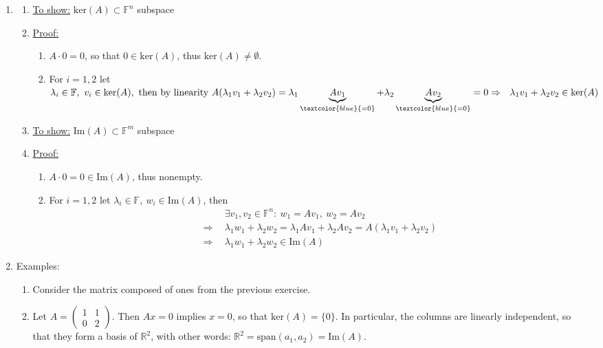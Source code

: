 {\color{solution}
\begin{enumerate}
	\item 	
	\begin{enumerate}
		\item 	\underline{To show:} $\text{ker}(A)\subset\mathbb{F}^n$ subspace 
		\item[] 	\underline{Proof:}
		\begin{enumerate}
			\item $A\cdot0=0$, so that $0\in\text{ker}(A)$, thus $\text{ker}(A)\neq \emptyset$.
			\item For $i=1,2$ let $\lambda_i\in\mathbb{F},~v_i\in\text{ker}(A),~\text{then by linearity}~
			A(\lambda_1v_1+ \lambda_2v_2)
			=\lambda_1\underbrace{Av_1}_{\textcolor{blue}{=0}}+\lambda_2\underbrace{Av_2}_{\textcolor{blue}{=0}}=0\\
			\Rightarrow~~\lambda_1v_1+ \lambda_2v_2\in\text{ker}(A)$
		\end{enumerate}
		\item \underline{To show:} $\text{Im}(A)\subset\mathbb{F}^m$ subspace
		\item[] 	\underline{Proof:}
		\begin{enumerate}
			\item $A\cdot0=0\in\text{Im}(A)$, thus nonempty.
			\item For $i=1,2$ let $\lambda_i\in\mathbb{F},~w_i\in\text{Im}(A)$, then
			\begin{align*}
			~~&\exists v_1,v_2\in \mathbb{F}^n:~w_1=Av_1,~w_2=Av_2\\
			\Rightarrow~~&\lambda_1 w_1+ \lambda_2 w_2=\lambda_1 Av_1+\lambda_2Av_2=A(\lambda_1 v_1+\lambda_2 v_2)\\
			\Rightarrow~~&\lambda_1 w_1+ \lambda_2w_2\in\text{Im}(A)
			\end{align*}
		\end{enumerate}
\end{enumerate}
\item Examples:
\begin{enumerate}
	\item Consider the matrix composed of ones from the previous exercise.
	\item Let $A = \begin{pmatrix}
	1&1\\0&2
	\end{pmatrix}$.
	Then $Ax = 0$ implies $x=0$, so that $\text{ker}(A)=\{0\}$. In particular, the columns are linearly independent, so that they form a basis of $\mathbb{R}^2$, with other words: $\mathbb{R}^2 = \text{span}(a_1,a_2)=\text{Im}(A)$.
\end{enumerate}
\end{enumerate}
}
